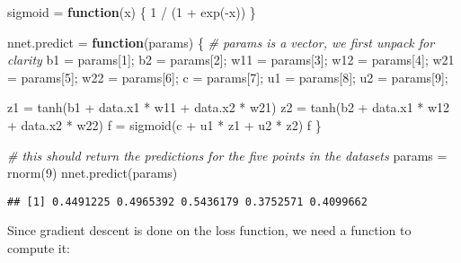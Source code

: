 \documentclass[
  a4paper,
]{article}
\newenvironment{Shaded}{\begin{snugshade}}{\end{snugshade}}
\newcommand{\CommentTok}[1]{\textcolor[rgb]{0.56,0.35,0.01}{\textit{#1}}}
\newcommand{\ControlFlowTok}[1]{\textcolor[rgb]{0.13,0.29,0.53}{\textbf{#1}}}
\newcommand{\DecValTok}[1]{\textcolor[rgb]{0.00,0.00,0.81}{#1}}
\newcommand{\FunctionTok}[1]{\textcolor[rgb]{0.00,0.00,0.00}{#1}}
\newcommand{\NormalTok}[1]{#1}
\newcommand{\OtherTok}[1]{\textcolor[rgb]{0.56,0.35,0.01}{#1}}
\newcommand{\SpecialCharTok}[1]{\textcolor[rgb]{0.00,0.00,0.00}{#1}}
\begin{document}
\begin{Shaded}
\begin{Highlighting}[]
\NormalTok{sigmoid }\OtherTok{=} \ControlFlowTok{function}\NormalTok{(x) \{}
  \DecValTok{1} \SpecialCharTok{/}\NormalTok{ (}\DecValTok{1} \SpecialCharTok{+} \FunctionTok{exp}\NormalTok{(}\SpecialCharTok{{-}}\NormalTok{x))}
\NormalTok{\}}

\NormalTok{nnet.predict }\OtherTok{=} \ControlFlowTok{function}\NormalTok{(params) \{}
  \CommentTok{\# params is a vector, we first unpack for clarity}
\NormalTok{  b1 }\OtherTok{=}\NormalTok{ params[}\DecValTok{1}\NormalTok{]; b2 }\OtherTok{=}\NormalTok{ params[}\DecValTok{2}\NormalTok{];}
\NormalTok{  w11 }\OtherTok{=}\NormalTok{ params[}\DecValTok{3}\NormalTok{]; w12 }\OtherTok{=}\NormalTok{ params[}\DecValTok{4}\NormalTok{];}
\NormalTok{  w21 }\OtherTok{=}\NormalTok{ params[}\DecValTok{5}\NormalTok{]; w22 }\OtherTok{=}\NormalTok{ params[}\DecValTok{6}\NormalTok{];}
\NormalTok{  c }\OtherTok{=}\NormalTok{ params[}\DecValTok{7}\NormalTok{]; u1 }\OtherTok{=}\NormalTok{ params[}\DecValTok{8}\NormalTok{]; u2 }\OtherTok{=}\NormalTok{ params[}\DecValTok{9}\NormalTok{];}
  
\NormalTok{  z1 }\OtherTok{=} \FunctionTok{tanh}\NormalTok{(b1 }\SpecialCharTok{+}\NormalTok{ data.x1 }\SpecialCharTok{*}\NormalTok{ w11 }\SpecialCharTok{+}\NormalTok{ data.x2 }\SpecialCharTok{*}\NormalTok{ w21)}
\NormalTok{  z2 }\OtherTok{=} \FunctionTok{tanh}\NormalTok{(b2 }\SpecialCharTok{+}\NormalTok{ data.x1 }\SpecialCharTok{*}\NormalTok{ w12 }\SpecialCharTok{+}\NormalTok{ data.x2 }\SpecialCharTok{*}\NormalTok{ w22)}
\NormalTok{  f }\OtherTok{=} \FunctionTok{sigmoid}\NormalTok{(c }\SpecialCharTok{+}\NormalTok{ u1 }\SpecialCharTok{*}\NormalTok{ z1 }\SpecialCharTok{+}\NormalTok{ u2 }\SpecialCharTok{*}\NormalTok{ z2)}
\NormalTok{  f}
\NormalTok{\}}

\CommentTok{\# this should return the predictions for the five points in the datasets}
\NormalTok{params }\OtherTok{=} \FunctionTok{rnorm}\NormalTok{(}\DecValTok{9}\NormalTok{)}
\FunctionTok{nnet.predict}\NormalTok{(params)}
\end{Highlighting}
\end{Shaded}

\begin{verbatim}
## [1] 0.4491225 0.4965392 0.5436179 0.3752571 0.4099662
\end{verbatim}

Since gradient descent is done on the loss function, we need a function
to compute it:
\end{document}
